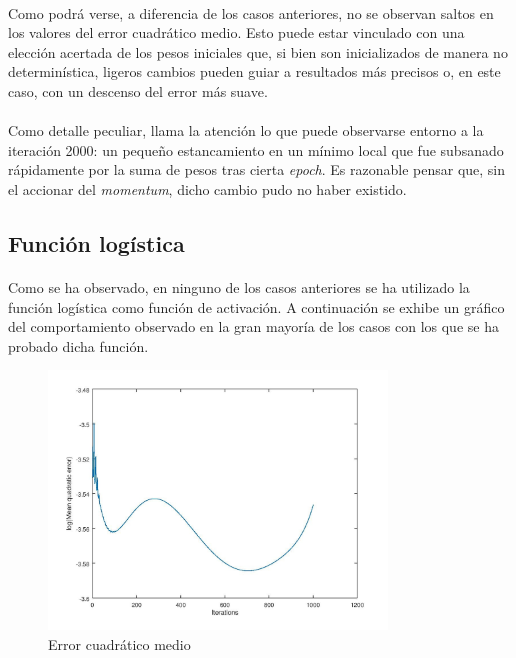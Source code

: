 \documentclass[12pt, twocolumn]{article}
\begin{document}
	\paragraph{} Como podrá verse, a diferencia de los casos anteriores, no se observan saltos en los valores del error cuadrático medio. Esto puede estar vinculado con una elección acertada de los pesos iniciales que, si bien son inicializados de manera no determinística, ligeros cambios pueden guiar a resultados más precisos o, en este caso, con un descenso del error más suave. 
	
	\paragraph{} Como detalle peculiar, llama la atención lo que puede observarse entorno a la iteración 2000: un pequeño estancamiento en un mínimo local que fue subsanado rápidamente por la suma de pesos tras cierta \textit{epoch}. Es razonable pensar que, sin el accionar del \textit{momentum}, dicho cambio pudo no haber existido. 
	
	\subsection{Función logística}
	
	\paragraph{} Como se ha observado, en ninguno de los casos anteriores se ha utilizado la función logística como función de activación. A continuación se exhibe un gráfico del comportamiento observado en la gran mayoría de los casos con los que se ha probado dicha función.
	
	\begin{figure}[H]
		\centering
		\includegraphics[width=9cm]{../results/why_not_log.jpg}
		\caption{Error cuadrático medio}
		\label{wnl}
	\end{figure}
	
\end{document}
